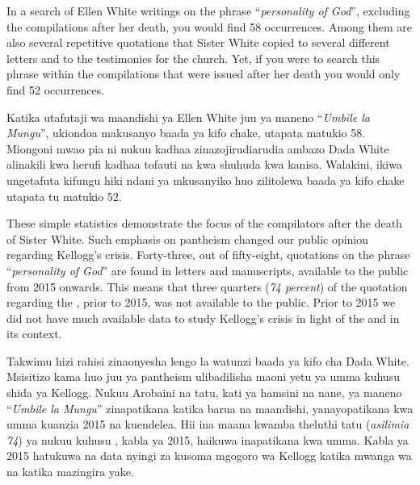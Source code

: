 In a search of Ellen White writings on the phrase “\textit{personality of God}”, excluding the compilations after her death, you would find 58 occurrences. Among them are also several repetitive quotations that Sister White copied to several different letters and to the testimonies for the church. Yet, if you were to search this phrase within the compilations that were issued after her death you would only find 52 occurrences.


Katika utafutaji wa maandishi ya Ellen White juu ya maneno “\textit{Umbile la Mungu}”, ukiondoa makusanyo baada ya kifo chake, utapata matukio 58. Miongoni mwao pia ni nukuu kadhaa zinazojirudiarudia ambazo Dada White alinakili kwa herufi kadhaa tofauti na kwa shuhuda kwa kanisa. Walakini, ikiwa ungetafuta kifungu hiki ndani ya mkusanyiko huo zilitolewa baada ya kifo chake utapata tu matukio 52.


These simple statistics demonstrate the focus of the compilators after the death of Sister White. Such emphasis on pantheism changed our public opinion regarding Kellogg’s crisis. Forty-three, out of fifty-eight, quotations on the phrase “\textit{personality of God}” are found in letters and manuscripts, available to the public from 2015 onwards. This means that three quarters (\textit{74 percent}) of the quotation regarding the , prior to 2015, was not available to the public. Prior to 2015 we did not have much available data to study Kellogg's crisis in light of the  and in its context.


Takwimu hizi rahisi zinaonyesha lengo la watunzi baada ya kifo cha Dada White. Msisitizo kama huo juu ya pantheism ulibadilisha maoni yetu ya umma kuhusu shida ya Kellogg. Nukuu Arobaini na tatu, kati ya hamsini na nane, ya maneno “\textit{Umbile la Mungu}” zinapatikana katika barua na maandishi, yanayopatikana kwa umma kuanzia 2015 na kuendelea. Hii ina maana kwamba theluthi tatu (\textit{asilimia 74}) ya nukuu kuhusu , kabla ya 2015, haikuwa inapatikana kwa umma. Kabla ya 2015 hatukuwa na data nyingi za kusoma mgogoro wa Kellogg katika mwanga wa  na katika mazingira yake.






